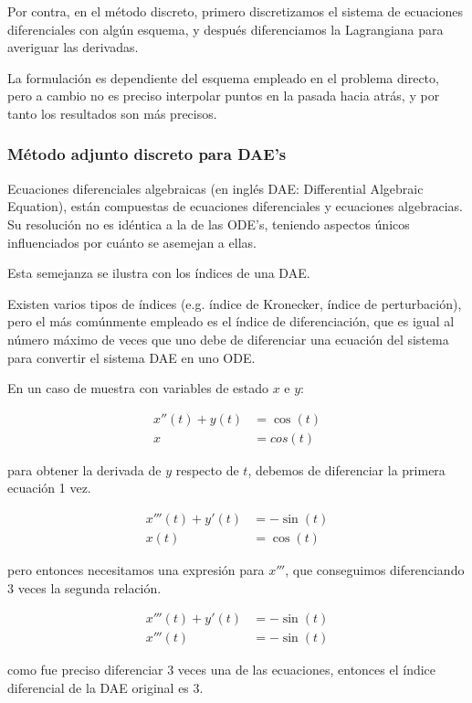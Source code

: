 Por contra, en el método discreto, primero discretizamos el sistema de
ecuaciones diferenciales con algún esquema, y después diferenciamos la
Lagrangiana para averiguar las derivadas.

La formulación es dependiente del esquema empleado en el problema directo, pero
a cambio no es preciso interpolar puntos en la pasada hacia atrás, y por tanto
los resultados son más precisos.

\subsubsection{Método adjunto discreto para DAE's}

Ecuaciones diferenciales algebraicas (en inglés DAE: Differential Algebraic
Equation), están compuestas de ecuaciones diferenciales y ecuaciones
algebracias. Su resolución no es idéntica a la de las ODE's, teniendo aspectos
únicos influenciados por cuánto se asemejan a ellas.

Esta semejanza se ilustra con los índices de una DAE.

Existen varios tipos de índices (e.g. índice de Kronecker, índice de perturbación),
pero el más comúnmente empleado es el índice de diferenciación, que es igual
al número máximo de veces que uno debe de diferenciar una ecuación del sistema
para convertir el sistema DAE en uno ODE.

En un caso de muestra con variables de estado $x$ e $y$:

\begin{align} x''(t) + y(t) & = \cos(t) \\
              x             & = cos(t)
\end{align}

para obtener la derivada de $y$ respecto de $t$, debemos de diferenciar la
primera ecuación 1 vez.

\begin{align}
	x'''(t) + y'(t) & = -\sin(t) \\
	x(t)            & = \cos(t)
\end{align}

pero entonces necesitamos una expresión para $x'''$, que conseguimos
diferenciando 3 veces la segunda relación.

\begin{align}
	x'''(t) + y'(t) & = -\sin(t) \\
	x'''(t)         & = -\sin(t)
\end{align}

como fue preciso diferenciar 3 veces una de las ecuaciones, entonces el índice
diferencial de la DAE original es 3.

